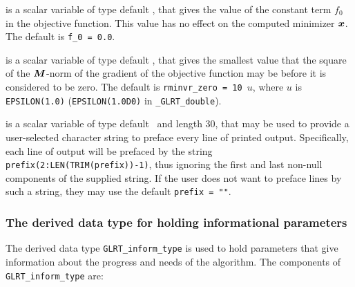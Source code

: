 \documentclass{galahad}
\newcommand{\packagename}{GL\-RT}
\newcommand{\fullpackagename}{\libraryname\_\packagename}
\begin{document}
\begin{description}
 is a scalar variable of type default
\realdp, that gives the value of the constant term $f_0$ in the
objective function. This value has no effect on the
computed minimizer ${\bm{x}}$. The default is {\tt f\_0 = 0.0}.

 is a scalar variable of type default
\realdp, that gives the smallest value that the square of the ${\bm{M}}$-norm of
the gradient of the objective function may be before it is considered to be
zero.
The default is {\tt rminvr\_zero = 10 $u$},
where $u$ is {\tt EPSILON(1.0)} ({\tt EPSILON(1.0D0)} in
{\tt \fullpackagename\_double}).

 is a scalar variable of type default \character\
and length 30, that may be used to provide a user-selected
character string to preface every line of printed output.
Specifically, each line of output will be prefaced by the string
{\tt prefix(2:LEN(TRIM(prefix))-1)},
thus ignoring the first and last non-null components of the
supplied string. If the user does not want to preface lines by such
a string, they may use the default {\tt prefix = ""}.

\end{description}


\subsubsection{The derived data type for holding informational
 parameters}\label{typeinfo}
The derived data type
{\tt \packagename\_inform\_type}
is used to hold parameters that give information about the progress and needs
of the algorithm. The components of
{\tt \packagename\_inform\_type}
are:
\end{document}
